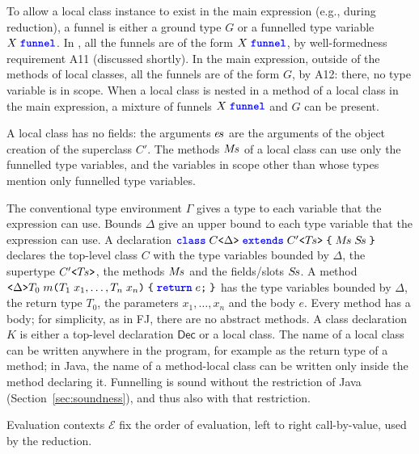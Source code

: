 To allow a local class instance to exist in the main expression (e.g., during reduction), a funnel is either a ground type $G$ or a funnelled type variable $X\mskip5mu\text{\ttfamily\bfseries\color{blue}funnel}$.
In \decls, all the funnels are of the form $X\mskip5mu\text{\ttfamily\bfseries\color{blue}funnel}$, by well-formedness requirement A11 (discussed shortly).
In the main expression, outside of the methods of local classes, all the funnels are of the form $G$, by A12: there, no type variable is in scope.
When a local class is nested in a method of a local class in the main expression, a mixture of funnels $X\mskip5mu\text{\ttfamily\bfseries\color{blue}funnel}$ and $G$ can be present.

A local class has no fields: the arguments $e\mkern-2mu s$ are the arguments of the object creation of the superclass $C'$.
The methods $M\mkern-2mu s$ of a local class can use only the funnelled type variables, and the variables in scope other than \Q@this@ whose types mention only funnelled type variables.

The conventional type environment $\Gamma$ gives a type to each variable that the expression can use.
Bounds $\Delta$ give an upper bound to each type variable that the expression can use.
A declaration $\text{\ttfamily\bfseries\color{blue}class}\mskip5muC\text{\ttfamily <}\Delta\text{\ttfamily >}\mskip5mu\text{\ttfamily\bfseries\color{blue}extends}\mskip5muC'\text{\ttfamily <}T\mkern-2mu s\text{\ttfamily >}\mskip5mu\text{\ttfamily \{}\mskip5mu M\mkern-2mu s\mskip5mu S\mkern-2mu s\mskip5mu\text{\ttfamily \}}$ declares the top-level class $C$ with the type variables bounded by $\Delta$, the supertype $C'\text{\ttfamily <}T\mkern-2mu s\text{\ttfamily >}$, the methods $M\mkern-2mu s$ and the fields/slots $S\mkern-2mu s$.
A method $\text{\ttfamily <}\Delta\text{\ttfamily >} T_0\mskip5mu m\text{\ttfamily (} T_1\mskip5mu x_1,\ldots,T_n\mskip5mu x_n\text{\ttfamily )}\mskip5mu\text{\ttfamily \{}\mskip5mu \text{\ttfamily\bfseries\color{blue}return}\mskip5mu e\text{\ttfamily ;}\mskip5mu\text{\ttfamily \}}$ has the type variables bounded by $\Delta$, the return type $T_0$, the parameters $x_1,\ldots,x_n$ and the body $e$.
Every method has a body; for simplicity, as in FJ, there are no abstract methods.
A class declaration $K$ is either a top-level declaration $\mathsf{Dec}$ or a local class.
The name of a local class can be written anywhere in the program, for example as the return type of a method; in Java, the name of a method-local class can be written only inside the method declaring it.
Funnelling is sound without the restriction of Java (Section~\ref{sec:soundness}), and thus also with that restriction.

Evaluation contexts $\mathcal{E}$ fix the order of evaluation, left to right call-by-value, used by the reduction.

